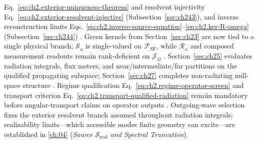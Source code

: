 Eq.~\eqref{eq:ch2.exterior-uniqueness-theorem} and resolvent injectivity
Eq.~\eqref{eq:ch2.exterior-resolvent-injective} (Subsection~\ref{sec:ch243}), and
inverse reconstruction limits
Eqs.~\eqref{eq:ch2.inverse-source-equation}--\eqref{eq:ch2.ker-R-omega}
(Subsection~\ref{sec:ch244}) \cite{stratton1941}. Green
kernels from Section~\ref{sec:ch23} are now tied to a single physical branch;
\(\mathcal{S}_\omega\) is single-valued on \(\mathcal{F}_{\mathrm{SF}}\), while
\(\mathcal{R}_\omega\) and composed measurement readouts remain rank-deficient on
\(\mathcal{J}_\Omega\) \cite{harrington2001}. Section~\ref{sec:ch25} evaluates
radiation integrals, flux meters, and near/intermediate/far partitions on the
qualified propagating subspace; Section~\ref{sec:ch27} completes non-radiating
null-space structure \cite{stratton1941}. Regime qualification
Eq.~\eqref{eq:ch2.regime-operator-screen} and transport criterion
Eq.~\eqref{eq:ch2.transport-qualified-radiation} remain mandatory before
angular-transport claims on operator outputs \cite{stratton1941}.
Outgoing-wave selection fixes the exterior resolvent branch assumed throughout radiation
integrals; realizability limits---which accessible modes finite geometry can
excite---are established in \ref{ch:04} (\emph{Source $\mathcal{S}_{\mathrm{real}}$ and Spectral Truncation}).

